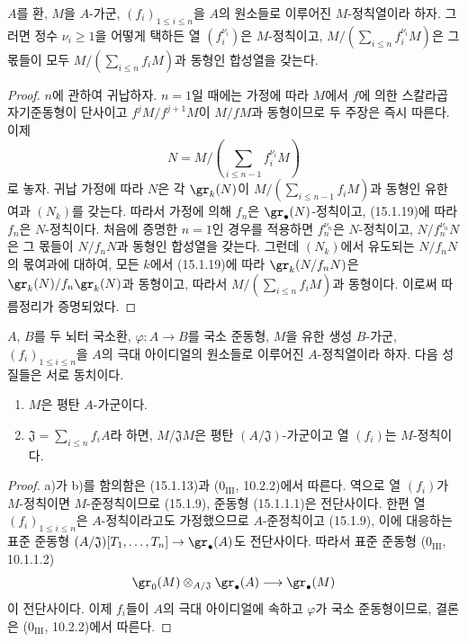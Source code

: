 \begin{corollary}[15.1.20]
\label{0.15.1.20-fr}
$A$를 환, $M$을 $A$-가군, $(f_i)_{1\leq i\leq n}$을 $A$의 원소들로
이루어진 $M$-정칙열이라 하자. 그러면 정수 $\nu_i\geq1$을 어떻게
택하든 열 $(f_i^{\nu_i})$은 $M$-정칙이고,
$M/(\sum_{i\leq n}f_i^{\nu_i}M)$은 그 몫들이 모두
$M/(\sum_{i\leq n}f_iM)$과 동형인 합성열을 갖는다.
\end{corollary}

\begin{proof}
$n$에 관하여 귀납하자. $n=1$일 때에는 가정에 따라 $M$에서 $f$에
의한 스칼라곱 자기준동형이 단사이고
$f^jM/f^{j+1}M$이 $M/fM$과 동형이므로 두 주장은 즉시 따른다. 이제
\[
  N=M/\left(\sum_{i\leq n-1}f_i^{\nu_i}M\right)
\]
로 놓자. 귀납 가정에 따라 $N$은 각 $\gr_k(N)$이
$M/(\sum_{i\leq n-1}f_iM)$과 동형인 유한 여과 $(N_k)$를 갖는다.
따라서 가정에 의해 $f_n$은 $\gr_\bullet(N)$-정칙이고, (15.1.19)에
따라 $f_n$은 $N$-정칙이다. 처음에 증명한 $n=1$인 경우를 적용하면
$f_n^{\nu_n}$은 $N$-정칙이고, $N/f_n^{\nu_n}N$은 그 몫들이
$N/f_nN$과 동형인 합성열을 갖는다. 그런데 $(N_k)$에서 유도되는
$N/f_nN$의 몫여과에 대하여, 모든 $k$에서 (15.1.19)에 따라
$\gr_k(N/f_nN)$은 $\gr_k(N)/f_n\gr_k(N)$과 동형이고, 따라서
$M/(\sum_{i\leq n}f_iM)$과 동형이다. 이로써 따름정리가 증명되었다.
\end{proof}

\begin{proposition}[15.1.21]
\label{0.15.1.21-fr}
$A$, $B$를 두 뇌터 국소환, $\varphi:A\to B$를 국소 준동형,
$M$을 유한 생성 $B$-가군, $(f_i)_{1\leq i\leq n}$을 $A$의 극대
아이디얼의 원소들로 이루어진 $A$-정칙열이라 하자. 다음 성질들은
서로 동치이다.
\begin{enumerate}
  \item[a)] $M$은 평탄 $A$-가군이다.
  \item[b)] $\mathfrak{J}=\sum_{i\leq n}f_iA$라 하면,
  $M/\mathfrak{J}M$은 평탄 $(A/\mathfrak{J})$-가군이고 열 $(f_i)$는
  $M$-정칙이다.
\end{enumerate}
\end{proposition}

\begin{proof}
a)가 b)를 함의함은 (15.1.13)과
($0_{\mathrm{III}}$, 10.2.2)에서 따른다. 역으로 열 $(f_i)$가
$M$-정칙이면 $M$-준정칙이므로 (15.1.9), 준동형 (15.1.1.1)은
전단사이다. 한편 열 $(f_i)_{1\leq i\leq n}$은 $A$-정칙이라고도
가정했으므로 $A$-준정칙이고 (15.1.9), 이에 대응하는 표준 준동형
$(A/\mathfrak{J})[T_1,\ldots,T_n]\to\gr_\bullet(A)$도 전단사이다.
따라서 표준 준동형 ($0_{\mathrm{III}}$, 10.1.1.2)
\[
  \gr_0(M)\otimes_{A/\mathfrak{J}}\gr_\bullet(A)
  \longrightarrow\gr_\bullet(M)
\]
이 전단사이다. 이제 $f_i$들이 $A$의 극대 아이디얼에 속하고
$\varphi$가 국소 준동형이므로, 결론은
($0_{\mathrm{III}}$, 10.2.2)에서 따른다.
\end{proof}

